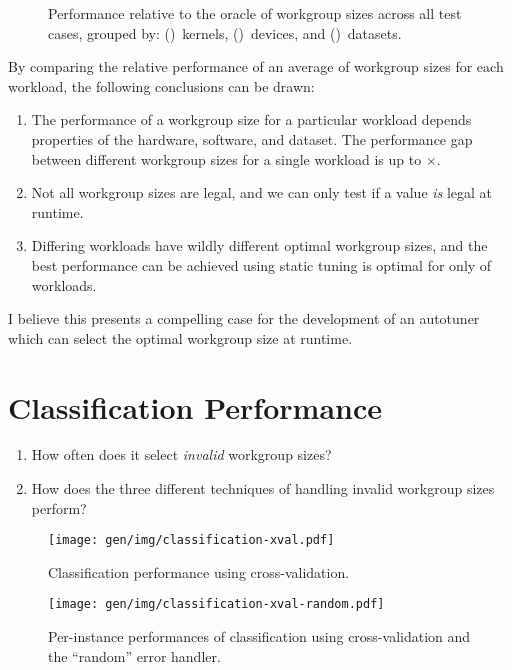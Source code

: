 \begin{figure}

\caption{%
  Performance relative to the oracle of workgroup sizes across all
  test cases, grouped by: ()~kernels,
  ()~devices, and
  ()~datasets.%
}
\label{fig:performances}
\end{figure}

By comparing the relative performance of an average of
 workgroup sizes for each workload, the
following conclusions can be drawn:

\begin{enumerate}
\item The performance of a workgroup size for a particular workload
  depends properties of the hardware, software, and dataset. The
  performance gap between different workgroup sizes for a single
  workload is up to $\times$.
\item Not all workgroup sizes are legal, and we can only test if a
  value \emph{is} legal at runtime.
\item Differing workloads have wildly different optimal workgroup
  sizes, and the best performance can be achieved using static tuning
  is optimal for only  of
  workloads.
\end{enumerate}

I believe this presents a compelling case for the development of an
autotuner which can select the optimal workgroup size at runtime.


\section{Classification Performance}

\begin{enumerate}
\item How often does it select \emph{invalid} workgroup sizes?
\item How does the three different techniques of handling invalid
  workgroup sizes perform?
\end{enumerate}

\begin{figure}
\centering
\texttt{[image: gen/img/classification-xval.pdf]}
\caption{%
  Classification performance using cross-validation.%
}
\end{figure}

\begin{figure}
\centering
\texttt{[image: gen/img/classification-xval-random.pdf]}
\caption{%
  Per-instance performances of classification using cross-validation
  and the ``random'' error handler.%
}
\end{figure}


